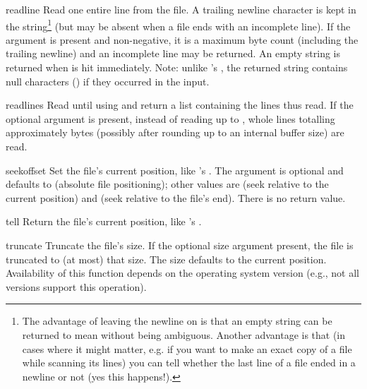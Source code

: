 \begin{methoddesc}[file]{readline}{}
  Read one entire line from the file.  A trailing newline character is
  kept in the string\footnote{
	The advantage of leaving the newline on is that an empty string 
	can be returned to mean \EOF{} without being ambiguous.  Another 
	advantage is that (in cases where it might matter, e.g. if you 
	want to make an exact copy of a file while scanning its lines) 
	you can tell whether the last line of a file ended in a newline
	or not (yes this happens!).}
  (but may be absent when a file ends with an
  incomplete line).  If the  argument is present and
  non-negative, it is a maximum byte count (including the trailing
  newline) and an incomplete line may be returned.
  An empty string is returned when \EOF{} is hit
  immediately.  Note: unlike 's , the returned
  string contains null characters () if they occurred in the
  input.
\end{methoddesc}

\begin{methoddesc}[file]{readlines}{}
  Read until \EOF{} using  and return a list containing
  the lines thus read.  If the optional  argument is
  present, instead of reading up to \EOF{}, whole lines totalling
  approximately  bytes (possibly after rounding up to an
  internal buffer size) are read.
\end{methoddesc}

\begin{methoddesc}[file]{seek}{offset}
  Set the file's current position, like 's .
  The  argument is optional and defaults to 
  (absolute file positioning); other values are  (seek
  relative to the current position) and  (seek relative to the
  file's end).  There is no return value.
\end{methoddesc}

\begin{methoddesc}[file]{tell}{}
  Return the file's current position, like 's
  .
\end{methoddesc}

\begin{methoddesc}[file]{truncate}{}
Truncate the file's size.  If the optional size argument present, the
file is truncated to (at most) that size.  The size defaults to the
current position.  Availability of this function depends on the
operating system version (e.g., not all \UNIX{} versions support this
operation).
\end{methoddesc}

